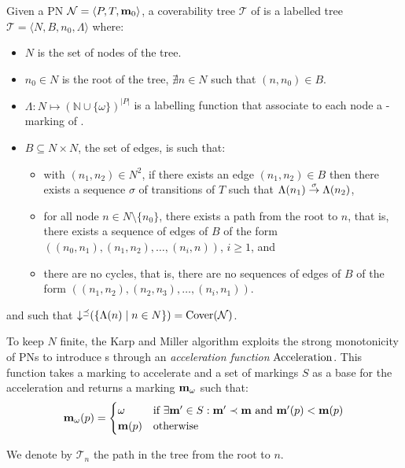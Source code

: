\begin{defi}
  Given a \ac{PN} $\mathcal{N} = \langle P,T, \mathbf{m}_0\rangle$, a coverability tree $\mathcal{T}$ of \N is a labelled tree $\mathcal{T} = \langle N, B, n_0, \Lambda\rangle$ where:
  \begin{itemize}
    \item $N$ is the set of nodes of the tree.%
    \item $n_0 \in N$ is the root of the tree,  $\nexists n \in N$ such that $(n, n_0) \in B$.
    \item $\Lambda : N \mapsto (\mathbb{N} \cup \{\omega\})^{|P|}$ is a labelling function that associate to each node a \textomega-marking of \N.
    \item $B \subseteq N \times N$, the set of edges, is such that:
      \begin{itemize}
        \item with $(n_1, n_2) \in N^2$, if there exists an edge $(n_1, n_2) \in B$ then there exists a sequence $\sigma$ of transitions of $T$ such that $\Lambda(n_1) \stackrel{\sigma}{\to} \Lambda(n_2)$,
        \item for all node $n \in N \setminus \{n_0\}$, there exists a path from the root to $n$, that is, there exists a sequence of edges of $B$ of the form $((n_0, n_1), (n_1, n_2), \dots, (n_{i}, n))$, $i \geq 1$, and
        \item there are no cycles, that is, there are no sequences of edges of $B$ of the form $((n_1, n_2), (n_2, n_3), \dots, (n_i, n_1))$.
      \end{itemize}
  \end{itemize}
  and such that $\operatorname{\downarrow^\preceq}(\{\Lambda(n) \mid n \in N\}) = \operatorname{Cover}(\mathcal{N})$.
\end{defi}

To keep $N$ finite, the Karp and Miller algorithm exploits the strong monotonicity of \acp{PN} to introduce \omark{}s through an \emph{acceleration function} $\operatorname{Acceleration}$.
This function takes a marking \mar to accelerate and a set of markings $S$ as a base  for the acceleration and returns a marking $\mathbf{m}_\omega$ such that:
\[
  \mathbf{m}_\omega(p) =
  \begin{cases}
    \omega    &\text{if } \exists \mathbf{m'} \in S : \mathbf{m'} \prec \mathbf{m} \text{ and } \mathbf{m'}(p) < \mathbf{m}(p) \\
    \mathbf{m}(p)  &\text{otherwise}
  \end{cases}
\]

We denote by $\mathscr{T}_n$ the path in the tree from the root to $n$.

